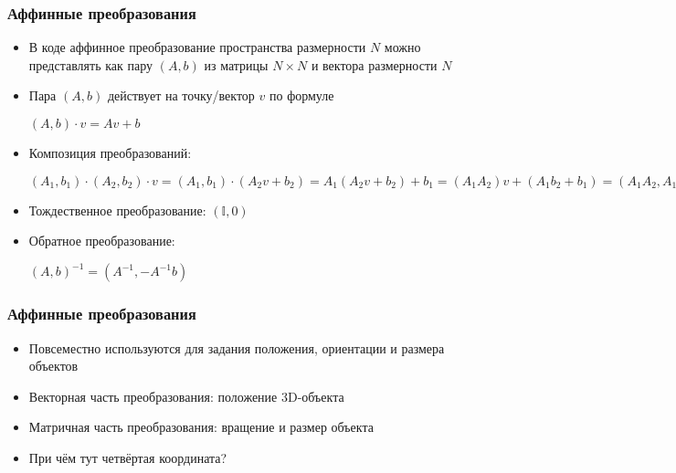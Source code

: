 \documentclass{beamer}
\begin{document}
\begin{frame}[fragile]
\frametitle{Аффинные преобразования}
\begin{itemize}
\item В коде аффинное преобразование пространства размерности \begin{math}N\end{math} можно представлять как пару \begin{math}(A,b)\end{math} из матрицы \begin{math}N\times N\end{math} и вектора размерности \begin{math}N\end{math}
\pause
\item Пара \begin{math}(A,b)\end{math} действует на точку/вектор \begin{math}v\end{math} по формуле

\begin{math}(A, b) \cdot v = Av + b\end{math}
\pause
\item Композиция преобразований:

\begin{math}(A_1, b_1) \cdot (A_2, b_2) \cdot v = (A_1, b_1) \cdot (A_2 v + b_2) = A_1 (A_2 v + b_2) + b_1 = (A_1 A_2) v + (A_1 b_2 + b_1) = (A_1 A_2, A_1 b_2 + b_1) \cdot v\end{math}
\pause
\item Тождественное преобразование:
\begin{math}(\mathbb I, 0)\end{math}
\pause
\item Обратное преобразование:

\begin{math}(A, b)^{-1} = (A^{-1}, -A^{-1}b)\end{math}
\end{itemize}
\end{frame}

\begin{frame}[fragile]
\frametitle{Аффинные преобразования}
\begin{itemize}
\item Повсеместно используются для задания положения, ориентации и размера объектов
\pause
\item Векторная часть преобразования: положение 3D-объекта
\pause
\item Матричная часть преобразования: вращение и размер объекта
\pause
\item При чём тут четвёртая координата?
\end{itemize}
\end{frame}
\end{document}
